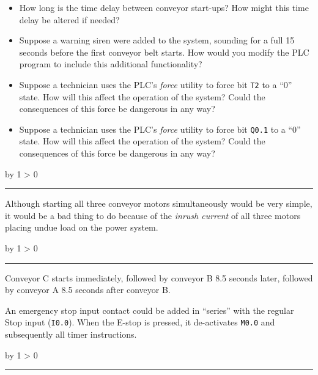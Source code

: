 \documentclass[12pt,a4paper]{article}
\def\oppgave{
            \advance\questnum by 1
            \ifnum \questnum > 0
                 \hrule
                 \vskip 3pt
                 \leftline{Oppgave \the\questnum}
                 \vskip 3pt \fi}
\def\svar{
           \advance\answnum by 1
           \ifnum \answnum > 0
                \hrule
                \vskip 3pt
                \leftline{Svar \the\answnum}
                \vskip 3pt \fi}
\def\notes{
           \advance\explnum by 1
           \ifnum \explnum > 0
                \hrule
                \vskip 3pt
                \leftline{Notes \the\explnum}
                \vskip 3pt \fi}
\begin{document}
\begin{itemize}
\item{} How long is the time delay between conveyor start-ups?  How might this time delay be altered if needed?
\item{} Suppose a warning siren were added to the system, sounding for a full 15 seconds before the first conveyor belt starts.  How would you modify the PLC program to include this additional functionality?
\item{} Suppose a technician uses the PLC's {\it force} utility to force bit {\tt T2} to a ``0'' state.  How will this affect the operation of the system?  Could the consequences of this force be dangerous in any way?
\item{} Suppose a technician uses the PLC's {\it force} utility to force bit {\tt Q0.1} to a ``0'' state.  How will this affect the operation of the system?  Could the consequences of this force be dangerous in any way?
\end{itemize}

\vskip 10pt \filbreak 





\svar{} 

Although starting all three conveyor motors simultaneously would be very simple, it would be a bad thing to do because of the {\it inrush current} of all three motors placing undue load on the power system.

\vskip 10pt \filbreak 





\notes{} 

Conveyor C starts immediately, followed by conveyor B 8.5 seconds later, followed by conveyor A 8.5 seconds after conveyor B.

\vskip 10pt

An emergency stop input contact could be added in ``series'' with the regular Stop input ({\tt I0.0}).  When the E-stop is pressed, it de-activates {\tt M0.0} and subsequently all timer instructions.


\vfil \eject 


\oppgave{} 
\end{document}
